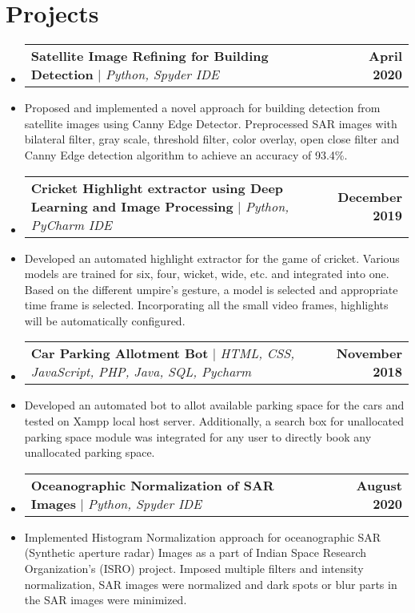 \documentclass[letterpaper,11pt]{article}
\makeatletter
\newcommand{\resumeProjectHeading}[2]{
    \item
    \begin{tabular*}{1.001\textwidth}{l@{\extracolsep{\fill}}r}
      \small#1 & \textbf{\small #2}\\
    \end{tabular*}\vspace{-7pt}
}
\newcommand{\resumeSubHeadingListStart}{\begin{itemize}[leftmargin=0.0in, label={}]}
\newcommand{\resumeSubHeadingListEnd}{\end{itemize}}
\makeatother
\begin{document}
\section{Projects}
    \vspace{-5pt}
    \resumeSubHeadingListStart
      \resumeProjectHeading
          {\textbf{Satellite Image Refining for Building Detection} $|$ \emph{Python, Spyder IDE}}{April 2020}
          \item{Proposed and implemented a novel approach for building detection from satellite images using Canny Edge Detector. Preprocessed SAR images with bilateral filter, gray scale, threshold filter, color overlay, open close filter and Canny Edge detection algorithm to achieve an accuracy of 93.4\%.}
          \vspace{-18pt}
          \resumeProjectHeading
          {\textbf{Cricket Highlight extractor using Deep Learning and Image Processing} $|$ \emph{Python, PyCharm IDE}}{December 2019}
          \item{Developed an automated highlight extractor for the game of cricket. Various models are trained for six, four, wicket, wide, etc. and integrated into one. Based on the different umpire's gesture, a model is selected and appropriate time frame is selected. Incorporating all the small video frames, highlights will be automatically configured.}
          \vspace{-18pt}
          \resumeProjectHeading
          {\textbf{Car Parking Allotment Bot} $|$ \emph{HTML, CSS, JavaScript, PHP, Java,  SQL, Pycharm}}{November 2018}
          \item{
          Developed an automated bot to allot available parking space for the cars and tested on Xampp local host server. Additionally, a search box for unallocated parking space module was integrated for any user to directly book any unallocated parking space.    
          }
          \vspace{-18pt}
          \resumeProjectHeading
          {\textbf{Oceanographic Normalization of SAR Images} $|$ \emph{Python, Spyder IDE}}{August 2020}
          \item{Implemented Histogram Normalization approach for oceanographic SAR (Synthetic aperture radar) Images as a part of Indian Space Research Organization's (ISRO) project. Imposed multiple filters and intensity normalization, SAR images were normalized and dark spots or blur parts in the SAR images were minimized.} 
    \resumeSubHeadingListEnd
\vspace{-18pt}
\end{document}
